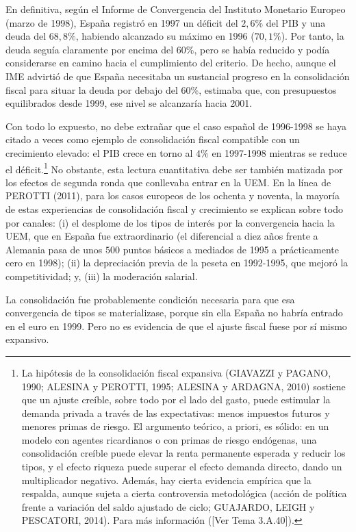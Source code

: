 \documentclass[10pt,a4paper]{article}
\newcommand{\authorfont}[1]{{\fontfamily{EBGaramond-TLF}\selectfont #1}}
\begin{document}
En definitiva, según el Informe de Convergencia del Instituto Monetario Europeo (marzo de 1998), España registró en 1997 un déficit del $2,6\%$ del PIB y una deuda del $68,8\%$, habiendo alcanzado su máximo en 1996 ($70,1\%$). Por tanto, la deuda seguía claramente por encima del $60\%$, pero se había reducido y podía considerarse en camino hacia el cumplimiento del criterio. De hecho, aunque el IME advirtió de que España necesitaba un sustancial progreso en la consolidación fiscal para situar la deuda por debajo del $60\%$, estimaba que, con presupuestos equilibrados desde 1999, ese nivel se alcanzaría hacia 2001.

Con todo lo expuesto, no debe extrañar que el caso español de 1996-1998 se haya citado a veces como ejemplo de consolidación fiscal compatible con un crecimiento elevado: el PIB crece en torno al $4\%$ en 1997-1998 mientras se reduce el déficit.\footnote{%
    La hipótesis de la consolidación fiscal expansiva (GIAVAZZI y PAGANO, 1990; ALESINA y PEROTTI, 1995; ALESINA y ARDAGNA, 2010) sostiene que un ajuste creíble, sobre todo por el lado del gasto, puede estimular la demanda privada a través de las expectativas: menos impuestos futuros y menores primas de riesgo. El argumento teórico, a priori, es sólido: en un modelo con agentes ricardianos o con primas de riesgo endógenas, una consolidación creíble puede elevar la renta permanente esperada y reducir los tipos, y el efecto riqueza puede superar el efecto demanda directo, dando un multiplicador negativo. Además, hay cierta evidencia empírica que la respalda, aunque sujeta a cierta controversia metodológica (acción de política frente a variación del saldo ajustado de ciclo; GUAJARDO, LEIGH y PESCATORI, 2014). Para más información ([\authorfont{Ver Tema 3.A.40}]).
} No obstante, esta lectura cuantitativa debe ser también matizada por los efectos de segunda ronda que conllevaba entrar en la UEM. En la línea de PEROTTI (2011), para los casos europeos de los ochenta y noventa, la mayoría de estas experiencias de consolidación fiscal y crecimiento se explican sobre todo por canales: (i) el desplome de los tipos de interés por la convergencia hacia la UEM, que en España fue extraordinario (el diferencial a diez años frente a Alemania pasa de unos $500$ puntos básicos a mediados de 1995 a prácticamente cero en 1998); (ii) la depreciación previa de la peseta en 1992-1995, que mejoró la competitividad; y, (iii) la moderación salarial.

La consolidación fue probablemente condición necesaria para que esa convergencia de tipos se materializase, porque sin ella España no habría entrado en el euro en 1999. Pero no es evidencia de que el ajuste fiscal fuese por sí mismo expansivo. 
\end{document}

